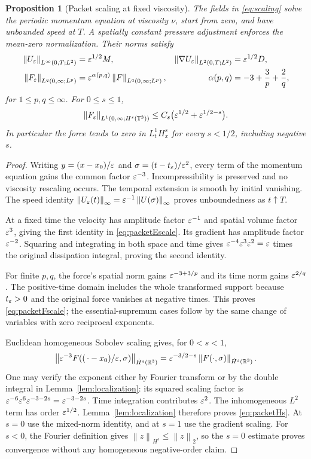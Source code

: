 \documentclass[11pt,a4paper]{article}
\newtheorem{proposition}[theorem]{Proposition}
\theoremstyle{definition}\newtheorem{definition}[theorem]{Definition}
\theoremstyle{remark}\newtheorem{remark}[theorem]{Remark}
\newcommand{\R}{\mathbb R}\newcommand{\TT}{\mathbb T^3}
\newcommand{\norm}[1]{\left\lVert#1\right\rVert}
\begin{document}
\begin{proposition}[Packet scaling at fixed viscosity]\label{prop:scaling}
The fields in \eqref{eq:scaling} solve the periodic momentum equation at viscosity $\nu$, start from zero, and have unbounded speed at $T$. A spatially constant pressure adjustment enforces the mean-zero normalization. Their norms satisfy
\begin{align}
 \norm{U_\eps}_{L^\infty(0,T;L^2)}
    &=\eps^{1/2}M,&
 \norm{\nabla U_\eps}_{L^2(0,T;L^2)}
    &=\eps^{1/2}D,\label{eq:packetEscale}\\
 \norm{F_\eps}_{L^q(0,\infty;L^p)}
    &=\eps^{\alpha(p,q)}\norm{F}_{L^q(0,\infty;L^p)},&
 \alpha(p,q)&=-3+\frac3p+\frac2q,\label{eq:packetFscale}
\end{align}
for $1\le p,q\le\infty$. For $0\le s\le1$,
\begin{equation}\label{eq:packetHs}
 \norm{F_\eps}_{L^1(0,\infty;H^s(\TT))}
 \le C_s\bigl(\eps^{1/2}+\eps^{1/2-s}\bigr).
\end{equation}
In particular the force tends to zero in $L^1_tH^s_x$ for every $s<1/2$, including negative $s$.
\end{proposition}
\begin{proof}
Writing $y=(x-x_0)/\varepsilon$ and $\sigma=(t-t_\varepsilon)/\varepsilon^2$, every term of the momentum equation gains the common factor $\varepsilon^{-3}$. Incompressibility is preserved and no viscosity rescaling occurs. The temporal extension is smooth by initial vanishing. The speed identity
$\norm{U_\eps(t)}_\infty=\eps^{-1}\norm{U(\sigma)}_\infty$
proves unboundedness as $t\uparrow T$.

At a fixed time the velocity has amplitude factor $\varepsilon^{-1}$ and spatial volume factor $\varepsilon^3$, giving the first identity in \eqref{eq:packetEscale}. Its gradient has amplitude factor $\varepsilon^{-2}$. Squaring and integrating in both space and time gives
$\varepsilon^{-4}\varepsilon^3\varepsilon^2=\varepsilon$ times the original dissipation integral, proving the second identity.

For finite $p,q$, the force's spatial norm gains $\varepsilon^{-3+3/p}$ and its time norm gains $\varepsilon^{2/q}$. The positive-time domain includes the whole transformed support because $t_\varepsilon>0$ and the original force vanishes at negative times. This proves \eqref{eq:packetFscale}; the essential-supremum cases follow by the same change of variables with zero reciprocal exponents.

Euclidean homogeneous Sobolev scaling gives, for $0<s<1$,
\[
 \norm{\eps^{-3}F((\,\cdot-x_0)/\eps,\sigma)}
          _{\dot H^s(\R^3)}
 =\eps^{-3/2-s}\norm{F(\cdot,\sigma)}_{\dot H^s(\R^3)}.
\]
One may verify the exponent either by Fourier transform or by the double integral in Lemma~\ref{lem:localization}: its squared scaling factor is
$\varepsilon^{-6}\varepsilon^6\varepsilon^{-3-2s}=\varepsilon^{-3-2s}$.
Time integration contributes $\varepsilon^2$. The inhomogeneous $L^2$ term has order $\varepsilon^{1/2}$. Lemma~\ref{lem:localization} therefore proves \eqref{eq:packetHs}. At $s=0$ use the mixed-norm identity, and at $s=1$ use the gradient scaling. For $s<0$, the Fourier definition gives $\norm{z}_{H^s}\le\norm{z}_2$, so the $s=0$ estimate proves convergence without any homogeneous negative-order claim.
\end{proof}
\end{document}
